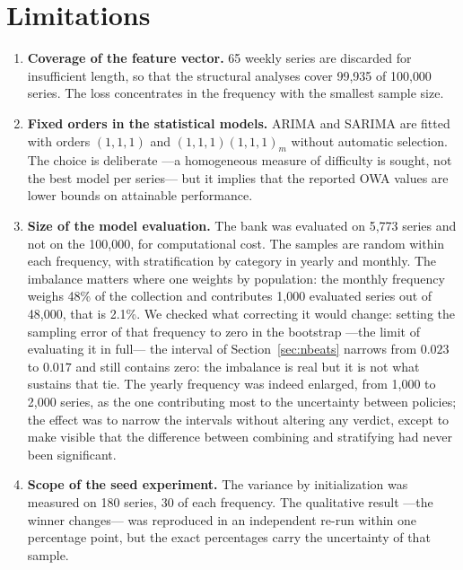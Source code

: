 \section{Limitations}\label{sec:limitaciones}

\begin{enumerate}
\item \textbf{Coverage of the feature vector.} 65 weekly series are discarded for
      insufficient length, so that the structural analyses cover 99{,}935 of 100{,}000
      series. The loss concentrates in the frequency with the smallest sample size.

\item \textbf{Fixed orders in the statistical models.} ARIMA and SARIMA are fitted with
      orders $(1,1,1)$ and $(1,1,1)(1,1,1)_m$ without automatic selection. The choice is
      deliberate ---a homogeneous measure of difficulty is sought, not the best model per
      series--- but it implies that the reported OWA values are lower bounds on attainable
      performance.

\item \textbf{Size of the model evaluation.} The bank was evaluated on 5{,}773 series and
      not on the 100{,}000, for computational cost. The samples are random within each
      frequency, with stratification by category in yearly and monthly. The imbalance
      matters where one weights by population: the monthly frequency weighs 48\% of the
      collection and contributes 1{,}000 evaluated series out of 48{,}000, that is 2.1\%.
      We checked what correcting it would change: setting the sampling error of that
      frequency to zero in the bootstrap ---the limit of evaluating it in full--- the
      interval of Section~\ref{sec:nbeats} narrows from $0.023$ to $0.017$ and still
      contains zero: the imbalance is real but it is not what sustains that tie. The
      yearly frequency was indeed enlarged, from 1{,}000 to 2{,}000 series, as the one
      contributing most to the uncertainty between policies; the effect was to narrow the
      intervals without altering any verdict, except to make visible that the difference
      between combining and stratifying had never been significant.

\item \textbf{Scope of the seed experiment.} The variance by initialization was measured
      on 180 series, 30 of each frequency. The qualitative result ---the winner changes---
      was reproduced in an independent re-run within one percentage point, but the exact
      percentages carry the uncertainty of that sample.


\end{enumerate}
